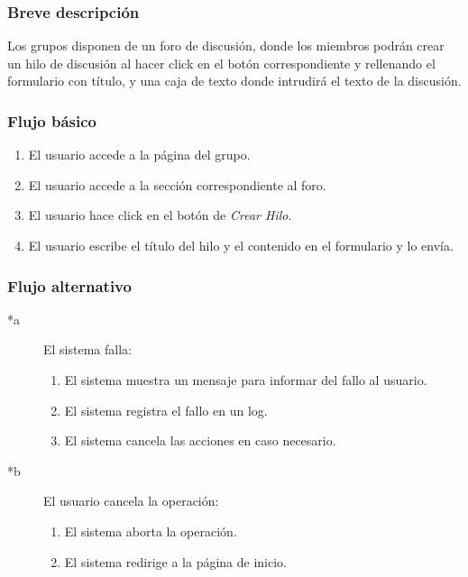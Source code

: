 \documentclass[12pt, a4paper, titlepage]{article}
\begin{document}
\subsubsection{Breve descripción}
Los grupos disponen de un foro de discusión, donde los miembros podrán crear un hilo de discusión al hacer click en el botón correspondiente y rellenando el formulario con título, y una caja de texto donde intrudirá el texto de la discusión.

\subsubsection{Flujo básico}
\begin{enumerate}
	\item El usuario accede a la página del grupo.
	\item El usuario accede a la sección correspondiente al foro.
	\item El usuario hace click en el botón de \textit{Crear Hilo}.
	\item El usuario escribe el título del hilo y el contenido en el formulario y lo envía.
\end{enumerate}
\subsubsection{Flujo alternativo}

\begin{description}
	\item [*a] El sistema falla:
	\begin{enumerate}
		\item El sistema muestra un mensaje para informar del fallo al usuario.
		\item El sistema registra el fallo en un log.
		\item El sistema cancela las acciones en caso necesario.
	\end{enumerate}
\end{description}

\begin{description}
	\item [*b] El usuario cancela la operación:
	\begin{enumerate}
		\item El sistema aborta la operación.
		\item El sistema redirige a la página de inicio.
	\end{enumerate}
\end{description}
\end{document}
